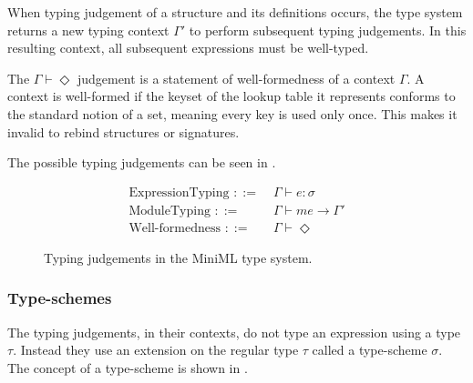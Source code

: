 When typing judgement of a structure and its definitions occurs, the type system returns a new typing context $\Gamma'$ to perform subsequent typing judgements.
In this resulting context, all subsequent expressions must be well-typed.

The $\Gamma \vdash \Diamond$ judgement is a statement of well-formedness of a context $\Gamma$. 
A context is well-formed if the keyset of the lookup table it represents conforms to the standard notion of a set, meaning every key is used only once.
This makes it invalid to rebind structures or signatures.

The possible typing judgements can be seen in .

\begin{figure}[!htb]
\begin{align*}
\text{ExpressionTyping } ::=\;&\Gamma \vdash e: \sigma \\
\text{ModuleTyping } ::= \; &\Gamma \vdash \mathit{me} \rightarrow \Gamma' \\
\text{Well-formedness } ::=\;&\Gamma \vdash \Diamond
\end{align*}
\caption[Typing Judgements]{Typing judgements in the MiniML type system.}
\label{fig:TypingJudgements}
\end{figure}

\subsubsection{Type-schemes}
The typing judgements, in their contexts, do not type an expression using a type $\tau$. Instead they use an extension on the regular type $\tau$ called a type-scheme $\sigma$.
The concept of a type-scheme is shown in .

